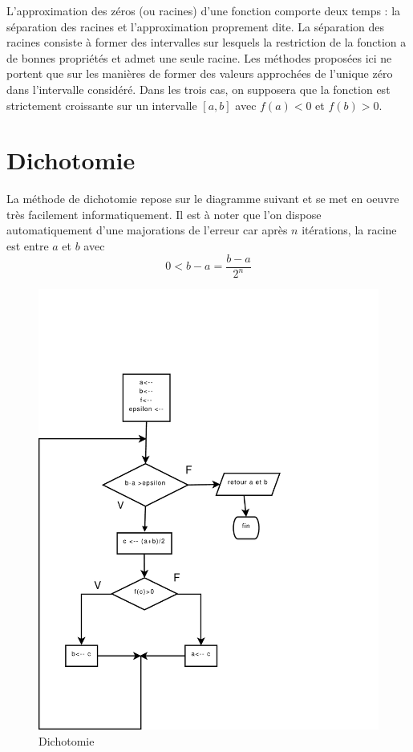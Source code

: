

L'approximation des zéros (ou racines) d'une fonction comporte deux temps : la séparation des racines et l'approximation proprement dite.\newline
La séparation des racines consiste à former des intervalles sur lesquels la restriction de la fonction a de bonnes propriétés et admet une seule racine. Les méthodes proposées ici ne portent que sur les manières de former des valeurs approchées de l'unique zéro dans l'intervalle considéré.\newline
Dans les trois cas, on supposera que la fonction est strictement croissante sur un intervalle $[a,b]$ avec $f(a)<0$ et $f(b)>0$.

\section{Dichotomie}
La méthode de dichotomie repose sur le diagramme suivant et se met en oeuvre très facilement informatiquement. Il est à noter que l'on dispose automatiquement d'une majorations de l'erreur car après $n$ itérations, la racine est entre $a$ et $b$ avec 
\begin{displaymath}
 0<b-a=\frac{b-a}{2^n}
\end{displaymath}
\begin{figure}[ht]
 \centering
 \includegraphics[width=12cm]{C2195_1.pdf}
 \caption{Dichotomie}
\label{C2195_1}
\end{figure}

